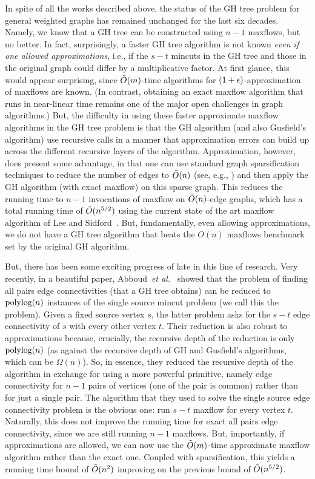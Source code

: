 In spite of all the works described above, the status of the GH tree problem for general weighted graphs has remained unchanged for the last six decades. Namely, we know that a GH tree can be constructed using $n-1$ maxflows, but no better. In fact, surprisingly, a faster GH tree algorithm is not known {\em even if one allowed approximations}, i.e., if the $s-t$ mincuts in the GH tree and those in the original graph could differ by a multiplicative factor. At first glance, this would appear surprising, since $\tilde{O}(m)$-time algorithms for  $(1+\epsilon)$-approximation of maxflows are known. (In contrast, obtaining an exact maxflow algorithm that runs in near-linear time remains one of the major open challenges in graph algorithms.) But, the difficulty in using these faster approximate maxflow algorithms in the GH tree problem is that the GH algorithm (and also Gusfield's algorithm) use recursive calls in a manner that approximation errors can build up across the different recursive layers of the algorithm. Approximation, however, does present some advantage, in that one can use standard graph sparsification techniques to reduce the number of edges to $\tilde{O}(n)$ (see, e.g., \cite{BenczurK15,FungHHP19}) and then apply the GH algorithm (with exact maxflow) on this sparse graph. This reduces the running time to $n-1$ invocations of maxflow on $\tilde{O}(n)$-edge graphs, which has a total running time of $\tilde{O}(n^{5/2})$ using the current state of the art maxflow algorithm of Lee and Sidford~\cite{LeeSflow}. But, fundamentally, even allowing approximations, we do not have a GH tree algorithm that beats the $O(n)$ maxflows benchmark set by the original GH algorithm.

But, there has been some exciting progress of late in this line of research. Very recently, in a beautiful paper, Abboud~{\em et al.}~\cite{AbboudKT20b} showed that the problem of finding all pairs edge connectivities (that a GH tree obtains) can be reduced to $\textup{polylog}(n)$ instances of the single source mincut problem (we call this the \ssc problem). Given a fixed source vertex $s$, the latter problem asks for the $s-t$ edge connectivity of $s$ with every other vertex $t$. Their reduction is also robust to approximations because, crucially, the recursive depth of the reduction is only $\textup{polylog}(n)$ (as against the recursive depth of GH and Gusfield's algorithms, which can be $\Omega(n)$). So, in essence, they reduced the recursive depth of the algorithm in exchange for using a more powerful primitive, namely edge connectivity for $n-1$ pairs of vertices (one of the pair is common) rather than for just a single pair. The algorithm that they used to solve the single source edge connectivity problem is the obvious one: run $s-t$ maxflow for every vertex $t$. Naturally, this does not improve the running time for exact all pairs edge connectivity, since we are still running $n-1$ maxflows. But, importantly, if approximations are allowed, we can now use the $\tilde{O}(m)$-time approximate maxflow algorithm rather than the exact one. Coupled with sparsification, this yields a running time bound of $\tilde{O}(n^2)$ improving on the previous bound of $\tilde{O}(n^{5/2})$. 

